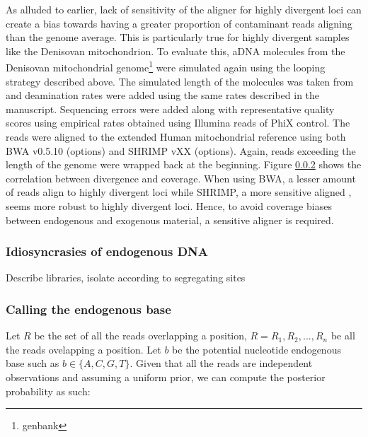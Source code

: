 \documentclass[a4paper,12pt]{article}
\begin{document}


As alluded to earlier, lack of sensitivity of the aligner for highly divergent loci can create a bias towards having a greater proportion of contaminant reads aligning than the genome average. This is particularly true for highly divergent samples like the Denisovan mitochondrion\cite{}. To evaluate this, aDNA molecules from the Denisovan mitochondrial genome\footnote{genbank} were simulated again using the looping strategy described above. The simulated length of the molecules was taken from \cite{Meyer} and deamination rates were added using the same rates described in the manuscript. Sequencing errors were added along with representative quality scores using empirical rates obtained using Illumina reads of PhiX control. The reads were aligned to the extended Human mitochondrial reference using both BWA v0.5.10 (options) and SHRIMP vXX \cite{} (options). Again, reads exceeding the length of the genome were wrapped back at the beginning. Figure \ref{} shows the correlation between divergence and coverage. When using BWA, a lesser amount of reads align to highly divergent loci while SHRIMP, a more sensitive aligned \cite{comparison}, seems more robust to highly divergent loci. Hence, to avoid coverage biases between endogenous and exogenous material, a sensitive aligner is required.


\subsubsection{Idiosyncrasies of endogenous DNA}
Describe libraries, isolate according to segregating sites






\subsubsection{Calling the endogenous base}


\noindent Let $R$ be the set of all the reads overlapping a position, $R={R_1,R_2,...,R_n}$ be all the reads ovelapping a position.  Let $b$ be the potential nucleotide endogenous base such as $b\in\{A,C,G,T\}$. Given that all the reads are independent observations and assuming a uniform prior, we can compute the posterior probability as such:
\end{document}

